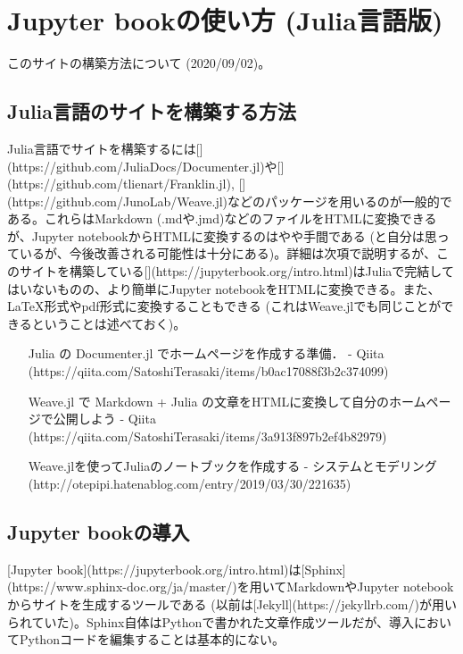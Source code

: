 \section{Jupyter bookの使い方 (Julia言語版)
}
このサイトの構築方法について (2020/09/02)。



\subsection{Julia言語のサイトを構築する方法
}
Julia言語でサイトを構築するには[\textbf{}](https://github.com/JuliaDocs/Documenter.jl)や[\textbf{}](https://github.com/tlienart/Franklin.jl), [\textbf{}](https://github.com/JunoLab/Weave.jl)などのパッケージを用いるのが一般的である。これらはMarkdown (.mdや.jmd)などのファイルをHTMLに変換できるが、Jupyter notebookからHTMLに変換するのはやや手間である (と自分は思っているが、今後改善される可能性は十分にある)。詳細は次項で説明するが、このサイトを構築している[\textbf{}](https://jupyterbook.org/intro.html)はJuliaで完結してはいないものの、より簡単にJupyter notebookをHTMLに変換できる。また、LaTeX形式やpdf形式に変換することもできる (これはWeave.jlでも同じことができるということは述べておく)。



\begin{itemize}
\item [Julia の Documenter.jl でホームページを作成する準備． - Qiita](https://qiita.com/SatoshiTerasaki/items/b0ac17088f3b2c374099)

\item [Weave.jl で Markdown + Julia の文章をHTMLに変換して自分のホームページで公開しよう - Qiita](https://qiita.com/SatoshiTerasaki/items/3a913f897b2ef4b82979)

\item [Weave.jlを使ってJuliaのノートブックを作成する - システムとモデリング](http://otepipi.hatenablog.com/entry/2019/03/30/221635)

\end{itemize}


\subsection{Jupyter bookの導入
}
[Jupyter book](https://jupyterbook.org/intro.html)は[Sphinx](https://www.sphinx-doc.org/ja/master/)を用いてMarkdownやJupyter notebookからサイトを生成するツールである (以前は[Jekyll](https://jekyllrb.com/)が用いられていた)。Sphinx自体はPythonで書かれた文章作成ツールだが、導入においてPythonコードを編集することは基本的にない。



